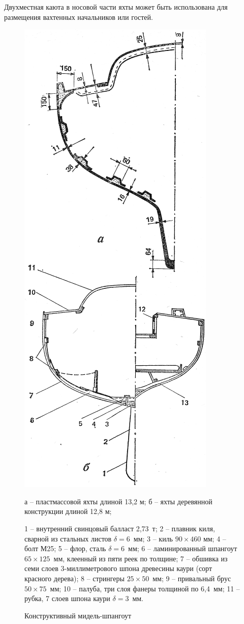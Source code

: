 \documentclass[a4paper, 12pt, twoside, final, book, russian, fittopage, cyremdash]{ncc}
\begin{document}
Двухместная каюта в носовой части яхты может быть использована для размещения вахтенных начальников или гостей. 

\begin{figure}[htb]
  \centering
  \includegraphics[scale=1.2]{0034P}
  \caption{Конструктивный мидель-шпангоут}
  \label{fig:34}
  \scriptsize
  \centering{}
а \--- пластмассовой яхты длиной 13,2 м; б \--- яхты деревянной конструкции длиной 12,8 м; 

1 \--- внутренний свинцовый балласт 2,73~т; 2 \--- плавник киля, сварной из стальных листов $\delta = 6$~мм; 3 \--- киль $90 \times 460$ мм; 4 \--- болт М25; 5 \--- флор, сталь $\delta = 6$~мм; 6 \--- ламинированный шпангоут $65 \times 125$~мм, клеенный из пяти реек по толщине; 7 \--- обшивка из семи слоев 3-миллиметрового шпона древесины каури (сорт красного дерева); 8 \--- стрингеры $25 \times 50$~мм; 9 \--- привальный брус $50 \times 75$~мм; 10 \--- палуба, три слоя фанеры толщиной по 6,4~мм; 11 \--- рубка, 7 слоев шпона каури $\delta = 3$~мм. 
\end{figure}
\end{document}
